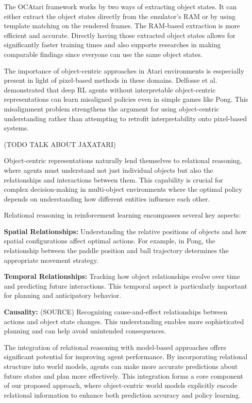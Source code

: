 \documentclass[
	english,
	ruledheaders=section,
	class=report,
	thesis={type=master},
	accentcolor=9c,
	custommargins=true,
	marginpar=false,
	parskip=half-,
	fontsize=11pt,
]{tudapub}
\begin{document}
The OCAtari framework works by two ways of extracting object states. It can either extract the object states directly from the emulator's RAM or by using template matching on the rendered frames. 
The RAM-based extraction is more efficient and accurate.
Directly having those extracted object states allows for significantly faster training times and also supports researches in making comparable findings since everyone can use the same object states.

The importance of object-centric approaches in Atari environments is esspecially present in light of pixel-based methods in these domains. Delfosse et al. demonstrated that deep 
RL agents without interpretable object-centric representations can learn misaligned policies even in simple games like Pong. \cite{delfosse2024interpretableconceptbottlenecksalign} 
This misalignment problem strengthens the argument for using object-centric understanding rather than attempting to retrofit interpretability onto pixel-based systems.

(TODO TALK ABOUT JAXATARI)


Object-centric representations naturally lend themselves to relational reasoning, where agents must understand not just individual objects but also
the relationships and interactions between them. This capability is crucial for complex decision-making in multi-object environments where the
 optimal policy depends on understanding how different entities influence each other.

Relational reasoning in reinforcement learning encompasses several key aspects:

\textbf{Spatial Relationships:} Understanding the relative positions of objects and how spatial configurations affect optimal actions. For example, in Pong, the relationship between the paddle position 
and ball trajectory determines the appropriate movement strategy.

\textbf{Temporal Relationships:} Tracking how object relationships evolve over time and predicting future interactions. This temporal aspect is particularly important for planning and anticipatory behavior.

\textbf{Causality:} (SOURCE) Recognizing cause-and-effect relationships between actions and object state changes. This understanding enables more sophisticated planning and can help avoid unintended consequences.

The integration of relational reasoning with model-based approaches offers significant potential for improving agent performance. By incorporating relational structure into world models, agents can make more 
accurate predictions about future states and plan more effectively. This integration forms a core component of our proposed approach, where object-centric world models explicitly encode relational information to enhance both prediction accuracy and policy learning.
\end{document}
